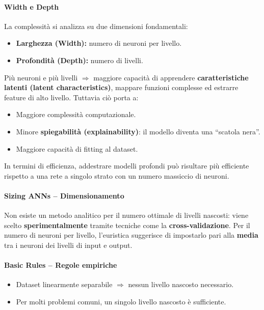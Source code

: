 \paragraph{Width e Depth}
La complessità si analizza su due dimensioni fondamentali:
\begin{itemize}
    \item \textbf{Larghezza (Width):} numero di neuroni per livello.
    \item \textbf{Profondità (Depth):} numero di livelli.
\end{itemize}
Più neuroni e più livelli $\Rightarrow$ maggiore capacità di apprendere
\textbf{caratteristiche latenti (latent characteristics)}, mappare
funzioni complesse ed estrarre feature di alto livello. Tuttavia ciò
porta a:
\begin{itemize}
    \item Maggiore complessità computazionale.
    \item Minore \textbf{spiegabilità (explainability)}: il modello diventa una ``scatola nera''.
    \item Maggiore capacità di fitting al dataset.
\end{itemize}

In termini di efficienza, addestrare modelli profondi può risultare più
efficiente rispetto a una rete a singolo strato con un numero massiccio
di neuroni.

\paragraph{Sizing ANNs -- Dimensionamento}
Non esiste un metodo analitico per il numero ottimale di livelli
nascosti: viene scelto \textbf{sperimentalmente} tramite tecniche come
la \textbf{cross-validazione}. Per il numero di neuroni per livello,
l'euristica suggerisce di impostarlo pari alla \textbf{media} tra i
neuroni dei livelli di input e output.

\paragraph{Basic Rules -- Regole empiriche}
\begin{itemize}
    \item Dataset linearmente separabile $\Rightarrow$ nessun livello nascosto necessario.
    \item Per molti problemi comuni, un singolo livello nascosto è sufficiente.
\end{itemize}

